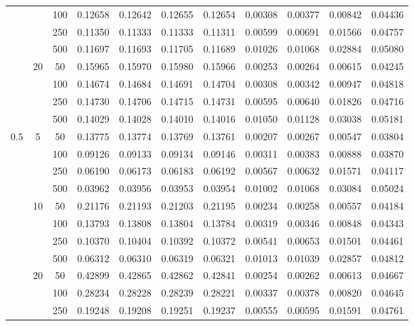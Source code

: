 \documentclass[10pt]{article}
\begin{document}
\begin{center}
\begin{longtable}{ccccccccccc}
		&&100& 0.12658 & 0.12642 & 0.12655 & 0.12654 & 0.00308 & 0.00377 & 0.00842 & 0.04436 \\ \cline{3-11}
		&&250& 0.11350 & 0.11333 & 0.11333 & 0.11311 & 0.00599 & 0.00691 & 0.01566 & 0.04757 \\ \cline{3-11}
		&&500& 0.11697 & 0.11693 & 0.11705 & 0.11689 & 0.01026 & 0.01068 & 0.02884 & 0.05080 \\ \cline{2-11}
		& \multirow{4}{*}{20}&50& 0.15965 & 0.15970 & 0.15980 & 0.15966 & 0.00253 & 0.00264 & 0.00615 & 0.04245 \\ \cline{3-11}
		&&100& 0.14674 & 0.14684 & 0.14691 & 0.14704 & 0.00308 & 0.00342 & 0.00947 & 0.04818 \\ \cline{3-11}
		&&250& 0.14730 & 0.14706 & 0.14715 & 0.14731 & 0.00595 & 0.00640 & 0.01826 & 0.04716 \\ \cline{3-11}
		&&500& 0.14029 & 0.14028 & 0.14010 & 0.14016 & 0.01050 & 0.01128 & 0.03038 & 0.05181 \\ \hline
		\multirow{12}{*}{$0.5$}
		& \multirow{4}{*}{5}&50 & 0.13775 & 0.13774 & 0.13769 & 0.13761 & 0.00207 & 0.00267 & 0.00547 & 0.03804 \\ \cline{3-11}
		&&100 & 0.09126 & 0.09133 & 0.09134 & 0.09146 & 0.00311 & 0.00383 & 0.00888 & 0.03870 \\ \cline{3-11}
		&&250 & 0.06190 & 0.06173 & 0.06183 & 0.06192 & 0.00567 & 0.00632 & 0.01571 & 0.04117 \\ \cline{3-11}
		&&500 & 0.03962 & 0.03956 & 0.03953 & 0.03954 & 0.01002 & 0.01068 & 0.03084 & 0.05024 \\ \cline{2-11}
		& \multirow{4}{*}{10}&50& 0.21176 & 0.21193 & 0.21203 & 0.21195 & 0.00234 & 0.00258 & 0.00557 & 0.04184 \\ \cline{3-11}
		&&100& 0.13793 & 0.13808 & 0.13804 & 0.13784 & 0.00319 & 0.00346 & 0.00848 & 0.04343 \\ \cline{3-11}
		&&250& 0.10370 & 0.10404 & 0.10392 & 0.10372 & 0.00541 & 0.00653 & 0.01501 & 0.04461 \\ \cline{3-11}
		&&500& 0.06312 & 0.06310 & 0.06319 & 0.06321 & 0.01013 & 0.01039 & 0.02857 & 0.04812 \\ \cline{2-11}
		& \multirow{4}{*}{20}&50& 0.42899 & 0.42865 & 0.42862 & 0.42841 & 0.00254 & 0.00262 & 0.00613 & 0.04667 \\ \cline{3-11}
		&&100& 0.28234 & 0.28228 & 0.28239 & 0.28221 & 0.00337 & 0.00378 & 0.00820 & 0.04645 \\ \cline{3-11}
		&&250& 0.19248 & 0.19208 & 0.19251 & 0.19237 & 0.00555 & 0.00595 & 0.01591 & 0.04761 \\ \cline{3-11}

\end{longtable}
\end{center}
\end{document}
